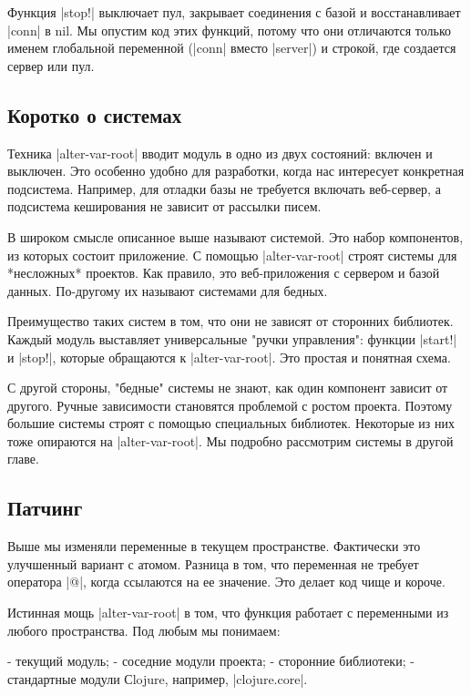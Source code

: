 Функция \spverb|stop!| выключает пул, закрывает соединения с базой и восстанавливает
\spverb|conn| в nil. Мы опустим код этих функций, потому что они отличаются только
именем глобальной переменной (\spverb|conn| вместо \spverb|server|) и строкой, где создается
сервер или пул.

\subsection{Коротко о системах}

Техника \spverb|alter-var-root| вводит модуль в одно из двух состояний: включен и
выключен. Это особенно удобно для разработки, когда нас интересует конкретная
подсистема. Например, для отладки базы не требуется включать веб-сервер, а
подсистема кеширования не зависит от рассылки писем.

В широком смысле описанное выше называют системой. Это набор компонентов, из
которых состоит приложение. С помощью \spverb|alter-var-root| строят системы для
*несложных* проектов. Как правило, это веб-приложения с сервером и базой
данных. По-другому их называют системами для бедных.

Преимущество таких систем в том, что они не зависят от сторонних
библиотек. Каждый модуль выставляет универсальные "ручки управления": функции
\spverb|start!| и \spverb|stop!|, которые обращаются к \spverb|alter-var-root|. Это простая и
понятная схема.

С другой стороны, "бедные" системы не знают, как один компонент зависит от
другого. Ручные зависимости становятся проблемой с ростом проекта. Поэтому
большие системы строят с помощью специальных библиотек. Некоторые из них тоже
опираются на \spverb|alter-var-root|. Мы подробно рассмотрим системы в другой главе.

\subsection{Патчинг}

Выше мы изменяли переменные в текущем пространстве. Фактически это улучшенный
вариант с атомом. Разница в том, что переменная не требует оператора \spverb|@|, когда
ссылаются на ее значение. Это делает код чище и короче.

Истинная мощь \spverb|alter-var-root| в том, что функция работает с переменными из
любого пространства. Под любым мы понимаем:

- текущий модуль;
- соседние модули проекта;
- сторонние библиотеки;
- стандартные модули Сlojure, например, \spverb|clojure.core|.

